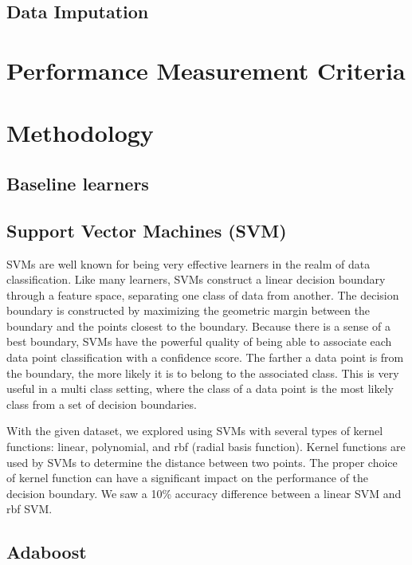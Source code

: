 \documentclass[conference]{IEEEtran}
\begin{document}
\subsection{Data Imputation}


\section{Performance Measurement Criteria}


\section{Methodology}

\subsection{Baseline learners}

\subsection{Support Vector Machines (SVM)}
SVMs are well known for being very effective learners in the realm of data classification. Like many learners, SVMs construct a linear decision boundary through a feature space, separating one class of data from another. The decision boundary is constructed by maximizing the geometric margin between the boundary and the points closest to the boundary. Because there is a sense of a best boundary, SVMs have the powerful quality of being able to associate each data point classification with a confidence score. The farther a data point is from the boundary, the more likely it is to belong to the associated class. This is very useful in a multi class setting, where the class of a data point is the most likely class from a set of decision boundaries.

With the given dataset, we explored using SVMs with several types of kernel functions: linear, polynomial, and rbf (radial basis function). Kernel functions are used by SVMs to determine the distance between two points. The proper choice of kernel function can have a significant impact on the performance of the decision boundary. We saw a 10\% accuracy difference between a linear SVM and rbf SVM.

\subsection{Adaboost}
\end{document}
